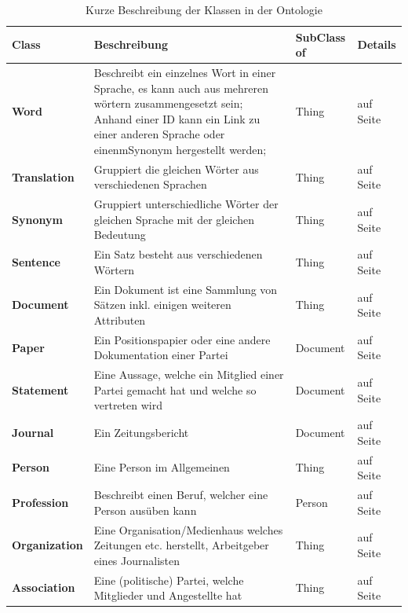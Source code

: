 \documentclass[draft,
    11pt,
    latin1,
    a4paper,
    oneside
]{scrreprt}
\begin{document}
\begin{table}[H]
  \centering
  \begin{tabular}{ | l | p{4cm} | l | l| }
    \hline
    \textbf{Class} & \textbf{Beschreibung} & \textbf{SubClass of} & \textbf{Details} \\ \hline
    \textbf{Word} & Beschreibt ein einzelnes Wort in einer Sprache, es kann auch aus mehreren w\"ortern zusammengesetzt sein; Anhand einer ID kann ein Link zu einer anderen Sprache oder einenmSynonym hergestellt werden; & Thing & \nameref{sec:class_word} auf Seite \pageref{sec:class_word} \\ \hline
    \textbf{Translation} & Gruppiert die gleichen W\"orter aus verschiedenen Sprachen & Thing & \nameref{sec:class_translation} auf Seite \pageref{sec:class_translation} \\ \hline
    \textbf{Synonym} & Gruppiert unterschiedliche W\"orter der gleichen Sprache mit der gleichen Bedeutung & Thing & \nameref{sec:class_synonym} auf Seite \pageref{sec:class_synonym} \\ \hline
    \textbf{Sentence} & Ein Satz besteht aus verschiedenen W\"ortern & Thing & \nameref{sec:class_sentence} auf Seite \pageref{sec:class_sentence} \\ \hline
    \textbf{Document} & Ein Dokument ist eine Sammlung von S\"atzen inkl. einigen weiteren Attributen & Thing & \nameref{sec:class_document} auf Seite \pageref{sec:class_document} \\ \hline
    \textbf{Paper} & Ein Positionspapier oder eine andere Dokumentation einer Partei & Document & \nameref{sec:class_paper} auf Seite \pageref{sec:class_paper} \\ \hline
    \textbf{Statement} & Eine Aussage, welche ein Mitglied einer Partei gemacht hat und welche so vertreten wird & Document & \nameref{sec:class_statement} auf Seite \pageref{sec:class_statement} \\ \hline
    \textbf{Journal} & Ein Zeitungsbericht & Document & \nameref{sec:class_journal} auf Seite \pageref{sec:class_journal} \\ \hline
    \textbf{Person} & Eine Person im Allgemeinen & Thing & \nameref{sec:class_person} auf Seite \pageref{sec:class_person} \\ \hline
    \textbf{Profession} & Beschreibt einen Beruf, welcher eine Person aus\"uben kann & Person & \nameref{sec:class_profession} auf Seite \pageref{sec:class_profession} \\ \hline
    \textbf{Organization} & Eine Organisation/Medienhaus welches Zeitungen etc. herstellt, Arbeitgeber eines Journalisten & Thing & \nameref{sec:class_organization} auf Seite \pageref{sec:class_organization} \\ \hline
    \textbf{Association} & Eine (politische) Partei, welche Mitglieder und Angestellte hat & Thing & \nameref{sec:class_association} auf Seite \pageref{sec:class_association} \\ \hline
  \end{tabular}
  \caption{Kurze Beschreibung der Klassen in der Ontologie}
  \label{tbl:classes}
\end{table}
\end{document}
